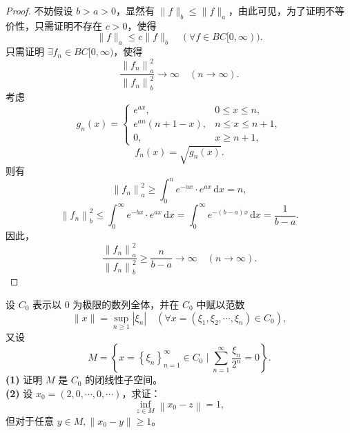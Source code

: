 \documentclass[lang=cn,newtx,10pt,scheme=chinese,thmcnt=chapter]{elegantbook}
\newcommand{\dif}{\mathrm{d}}
\begin{document}
\begin{proof}
不妨假设 $b > a > 0$，显然有 $\|f\|_b \leqslant \|f\|_a$，由此可见，为了证明不等价性，只需证明不存在 $c > 0$，使得
\[
\|f\|_a \leqslant c \|f\|_b \quad (\forall f \in B C[0, \infty)).
\]
只需证明 $\exists f_n \in B C[0, \infty)$，使得
\[
\frac{\left\|f_n\right\|_a^2}{\left\|f_n\right\|_b^2} \to \infty \quad (n \to \infty).
\]
考虑
\[
g_n(x) = \begin{cases}
e^{a x}, & 0 \leqslant x \leqslant n, \\
e^{a n}(n+1-x), & n \leqslant x \leqslant n+1, \\
0, & x \geqslant n+1,
\end{cases}
\]
\[
f_n(x)= \sqrt{g_n(x)}.
\]
则有
\[
\left\|f_n\right\|_a^2 \geqslant \int_0^n e^{-a x} \cdot e^{a x} \, \dif x = n,
\]
\[
\left\|f_n\right\|_b^2 \leqslant \int_0^{\infty} e^{-b x} \cdot e^{a x} \, \dif x = \int_0^{\infty} e^{-(b-a) x} \, \dif x = \frac{1}{b-a}.
\]
因此，
\[
\frac{\left\|f_n\right\|_a^2}{\left\|f_n\right\|_b^2} \geqslant \frac{n}{b-a} \to \infty \quad (n \to \infty).
\]
\end{proof}
\begin{example}
设 $C_0$ 表示以 0 为极限的数列全体，并在 $C_0$ 中赋以范数
\[
\|x\| = \sup_{n \geqslant 1} \left|\xi_n\right| \quad (\forall x = (\xi_1, \xi_2, \cdots, \xi_n) \in C_0),
\]
又设
\[
M = \left\{ x = \left\{ \xi_n \right\}_{n=1}^{\infty} \in C_0 \mid \sum_{n=1}^{\infty} \frac{\xi_n}{2^n} = 0 \right\}.
\]
\textbf{(1)} 证明 $M$ 是 $C_0$ 的闭线性子空间。\\
\textbf{(2)} 设 $x_0 = (2, 0, \cdots, 0, \cdots)$，求证：
\[
\inf_{z \in M} \left\| x_0 - z \right\| = 1,
\]
但对于任意 $y \in M,\|x_0-y\|\geqslant 1$。
\end{example}
\end{document}
